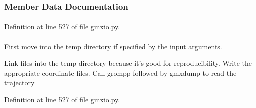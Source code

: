 \subsubsection{\-Member \-Data \-Documentation}
\hypertarget{classforcebalance_1_1gmxio_1_1GMX_a19372f8fcd41247cba35691d5a68695d}{
\paragraph[{\-Atom\-Lists}]{}}\label{classforcebalance_1_1gmxio_1_1GMX_a19372f8fcd41247cba35691d5a68695d}


\-Definition at line 527 of file gmxio.\-py.

\hypertarget{classforcebalance_1_1gmxio_1_1GMX_ab64c929dcf94ae0675174995c7014cb7}{
\paragraph[{\-Atom\-Mask}]{}}\label{classforcebalance_1_1gmxio_1_1GMX_ab64c929dcf94ae0675174995c7014cb7}


\-First move into the temp directory if specified by the input arguments. 

\-Link files into the temp directory because it's good for reproducibility. \-Write the appropriate coordinate files. \-Call grompp followed by gmxdump to read the trajectory 

\-Definition at line 527 of file gmxio.\-py.

\hypertarget{classforcebalance_1_1gmxio_1_1GMX_ac95b0bbbf2116fe2a568a5fffeec8dfb}{
\paragraph[{gmxpath}]{}}\label{classforcebalance_1_1gmxio_1_1GMX_ac95b0bbbf2116fe2a568a5fffeec8dfb}


